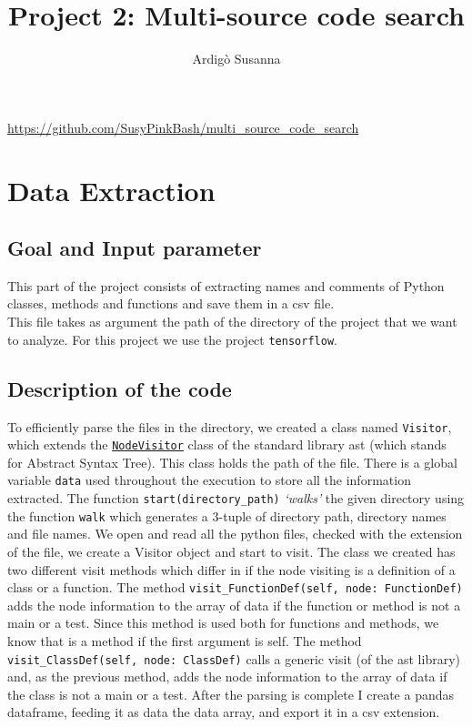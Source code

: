 \documentclass [14 pt]{article}
\title{Project 2: Multi-source code search}
\author{Ardig\`o Susanna}
\begin{document}
\pagestyle{fancy}
\fancyhf{}
\cfoot{\thepage}

\begin{titlingpage}
\maketitle
\centering
\url{https://github.com/SusyPinkBash/multi_source_code_search}
\end{titlingpage}

\newpage\thispagestyle{plain}
\tableofcontents
\newpage

\section{Data Extraction} %
\subsection{Goal and Input parameter} %
This part of the project consists of extracting names and comments of Python classes, methods and functions and save them in a csv file.\\
This file takes as argument the path of the directory of the project that we want to analyze. For this project we use the project \texttt{tensorflow}.

\subsection{Description of the code} %
To efficiently parse the files in the directory, we created a class named \texttt{Visitor}, which extends the \href{https://docs.python.org/3/library/ast.html#ast.NodeVisitor}{\texttt{NodeVisitor}} class of the standard library ast (which stands for Abstract Syntax Tree). This class holds the path of the file. There is a global variable \texttt{data} used throughout the execution to store all the information extracted.
The function \texttt{start(directory\_path)} \emph{`walks'} the given directory using the function \texttt{walk} which generates a 3-tuple of directory path, directory names and file names. We open and read all the python files, checked with the extension of the file, we create a Visitor object and start to visit. The class we created has two different visit methods which differ in if the node visiting is a definition of a class or a function.
The method \texttt{visit\_FunctionDef(self, node: FunctionDef)} adds the node information to the array of data if the function or method is not a main or a test. Since this method is used both for functions and methods, we know that is a method if the first argument is self.
The method \texttt{visit\_ClassDef(self, node: ClassDef)} calls a generic visit (of the ast library) and, as the previous method,           adds the node information to the array of data if the class is not a main or a test. 
After the parsing is complete I create a pandas dataframe, feeding it as data the data array, and export it in a csv extension.
\end{document}
